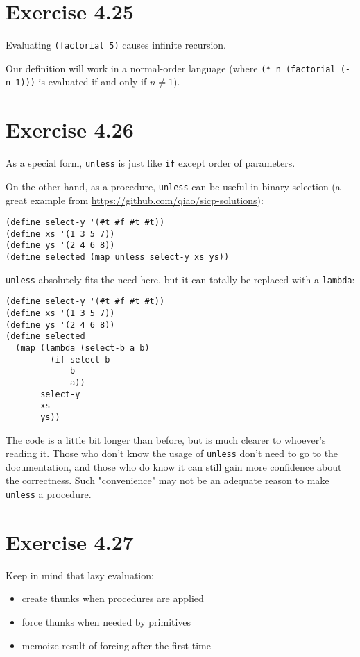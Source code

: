 \documentclass[../main.tex]{subfiles}
\begin{document}
\section{Exercise 4.25}

Evaluating \lstinline{(factorial 5)} causes infinite recursion.

Our definition will work in a normal-order language (where \lstinline{(* n (factorial (- n 1)))} is evaluated if and only if $n \neq 1$).

\section{Exercise 4.26}

As a special form, \lstinline{unless} is just like \lstinline{if} except order of parameters.

On the other hand, as a procedure, \lstinline{unless} can be useful in binary selection (a great example from \url{https://github.com/qiao/sicp-solutions}):

\begin{lstlisting}
(define select-y '(#t #f #t #t)) 
(define xs '(1 3 5 7)) 
(define ys '(2 4 6 8)) 
(define selected (map unless select-y xs ys))
\end{lstlisting}

\lstinline{unless} absolutely fits the need here, but it can totally be replaced with a \lstinline{lambda}:

\begin{lstlisting}
(define select-y '(#t #f #t #t)) 
(define xs '(1 3 5 7)) 
(define ys '(2 4 6 8)) 
(define selected
  (map (lambda (select-b a b)
         (if select-b
             b
             a))
       select-y
       xs
       ys))
\end{lstlisting}

The code is a little bit longer than before, but is much clearer to whoever's reading it. Those who don't know the usage of \lstinline{unless} don't need to go to the documentation, and those who do know it can still gain more confidence about the correctness. Such "convenience" may not be an adequate reason to make \lstinline{unless} a procedure.

\section{Exercise 4.27}

Keep in mind that lazy evaluation:

\begin{itemize}
\item create thunks when procedures are applied
\item force thunks when needed by primitives
\item memoize result of forcing after the first time
\end{itemize}
\end{document}
